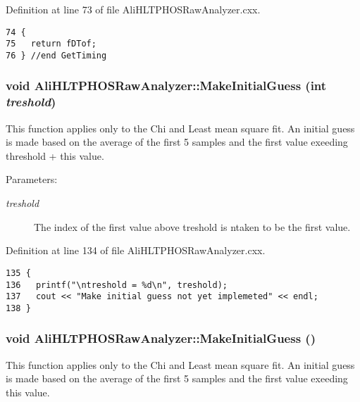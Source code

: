 Definition at line 73 of file Ali\-HLTPHOSRaw\-Analyzer.cxx.

\footnotesize\begin{verbatim}74 {
75   return fDTof;
76 } //end GetTiming
\end{verbatim}\normalsize 


\subsubsection{\setlength{\rightskip}{0pt plus 5cm}void Ali\-HLTPHOSRaw\-Analyzer::Make\-Initial\-Guess (int {\em treshold})}\label{classAliHLTPHOSRawAnalyzer_AliHLTPHOSRawAnalyzerPeakFindera15}


This function applies only to the Chi and Least mean square fit. An initial guess is made based on the average of the first 5 samples and the first value exeeding threshold + this value. \begin{Desc}
\item[Parameters:]
\begin{description}
\item[{\em treshold}]The index of the first value above treshold is ntaken to be the first value. \end{description}
\end{Desc}


Definition at line 134 of file Ali\-HLTPHOSRaw\-Analyzer.cxx.

\footnotesize\begin{verbatim}135 {
136   printf("\ntreshold = %d\n", treshold);
137   cout << "Make initial guess not yet implemeted" << endl;  
138 }
\end{verbatim}\normalsize 


\subsubsection{\setlength{\rightskip}{0pt plus 5cm}void Ali\-HLTPHOSRaw\-Analyzer::Make\-Initial\-Guess ()}\label{classAliHLTPHOSRawAnalyzer_AliHLTPHOSRawAnalyzerPeakFindera14}


This function applies only to the Chi and Least mean square fit. An initial guess is made based on the average of the first 5 samples and the first value exeeding this value. 

